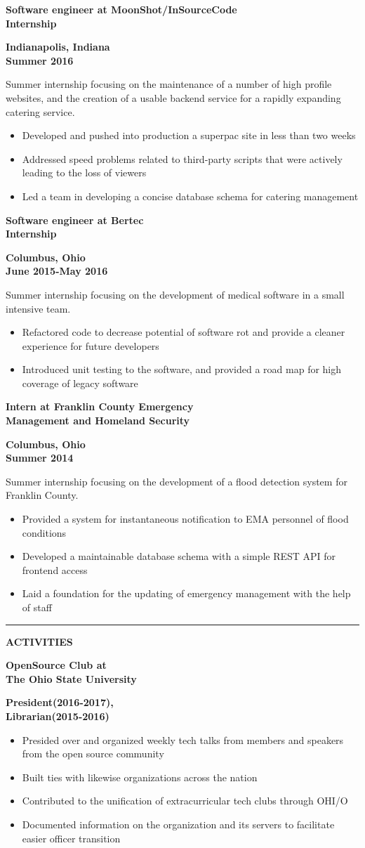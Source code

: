 \documentclass[letterpaper,10pt]{article}
\newcommand{\topic}[1]{\vspace{2mm} \rule[.5em]{10mm}{.2pt} {\large \bfseries #1} \xrfill[.5em]{.2pt} \newline \vspace{-2mm}}
\newcommand{\fullentry}[3] { \parbox[t]{.6\textwidth}{\large \bfseries #1} \hfill \parbox[t]{.4\textwidth}{\bfseries \raggedleft #2 \\ #3} \vspace{.5mm} \newline}
\begin{document}
		\fullentry{Software engineer at MoonShot/InSourceCode \\ Internship}{Indianapolis, Indiana}{Summer 2016}
			Summer internship focusing on the maintenance of a number of high profile websites, and the creation of a usable backend service for a rapidly expanding catering service.
			\begin{itemize}
				\item Developed and pushed into production a superpac site in less than two weeks
				\item Addressed speed problems related to third-party scripts that were actively leading to the loss of viewers
				\item Led a team in developing a concise database schema for catering management
			\end{itemize}

		\fullentry{Software engineer at Bertec \\ Internship}{Columbus, Ohio}{June 2015-May 2016}
			Summer internship focusing on the development of medical software in a small intensive team.
			\begin{itemize}
				\item Refactored code to decrease potential of software rot and provide a cleaner experience for future developers
				\item Introduced unit testing to the software, and provided a road map for high coverage of legacy software
			\end{itemize}
	
		\fullentry{Intern at Franklin County Emergency\\ Management and Homeland Security}{Columbus, Ohio}{Summer 2014}
			Summer internship focusing on the development of a flood detection system for Franklin County.
			\begin{itemize}
				\item Provided a system for instantaneous notification to EMA personnel of flood conditions
				\item Developed a maintainable database schema with a simple REST API for frontend access
				\item Laid a foundation for the updating of emergency management with the help of staff
			\end{itemize}

	\topic{ACTIVITIES}

		\fullentry{OpenSource Club at\\ The Ohio State University}{President(2016-2017),}{Librarian(2015-2016)}
		\vspace{-7mm}
		\begin{itemize}
			\item Presided over and organized weekly tech talks from members and speakers from the open source community
			\item Built ties with likewise organizations across the nation
			\item Contributed to the unification of extracurricular tech clubs through OHI/O
			\item Documented information on the organization and its servers to facilitate easier officer transition
		\end{itemize}
\end{document}
